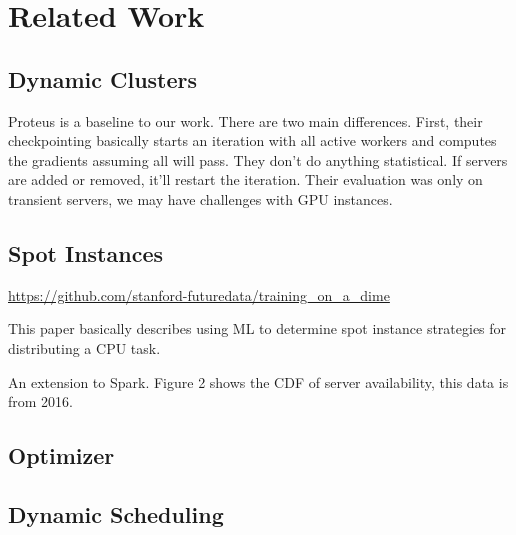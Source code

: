 \chapter{Related Work}
\label{ch:related work}

\section{Dynamic Clusters}


Proteus is a baseline to our work.
There are two main differences.
First, their checkpointing basically starts an iteration with all active workers
and computes the gradients assuming all will pass.
They don't do anything statistical.
If servers are added or removed, it'll restart the iteration.
Their evaluation was only on transient servers, we may have challenges with GPU
instances.

\section{Spot Instances}


\url{https://github.com/stanford-futuredata/training_on_a_dime}



This paper basically describes using ML to determine spot instance strategies
for distributing a CPU task.


An extension to Spark.
Figure 2 shows the CDF of server availability, this data is from 2016.

\section{Optimizer}


\section{Dynamic Scheduling}


